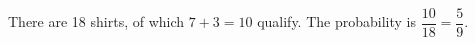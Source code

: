There are 18 shirts, of which $7+3=10$ qualify. The probability is $\dfrac{10}{18}=\boxed{\dfrac{5}{9}}$.
